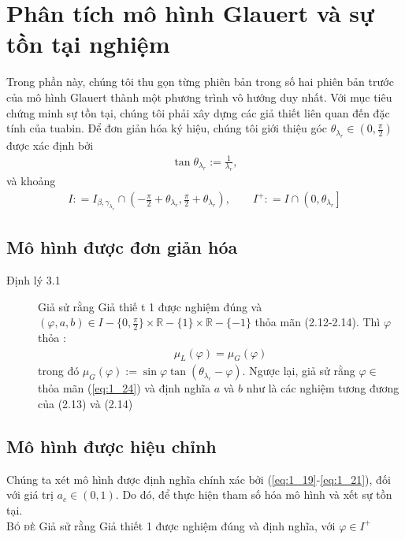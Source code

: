 \documentclass[a4paper,twoside,13pt]{extbook}
\begin{document}
\section{Phân tích mô hình Glauert và sự tồn tại nghiệm}

Trong phần này, chúng tôi thu gọn từng phiên bản trong số hai phiên bản trước của mô hình Glauert thành một phương trình vô hướng duy nhất. Với mục tiêu chứng minh sự tồn tại, chúng tôi phải xây dựng các giả thiết liên quan đến đặc tính của tuabin. Để đơn giản hóa ký hiệu, chúng tôi giới thiệu góc $\theta_{\lambda_r} \in (0,\frac{\pi}{2})$ được xác định bởi
\begin{equation}\label{eq:1_22}
    \begin{aligned}
        \tan\theta_{\lambda_r} := \frac{1}{\lambda_r},
    \end{aligned}
\end{equation}
và khoảng 
\begin{equation}\label{eq:1_23}
    \begin{aligned}
        I: = {I_{\beta ,{\gamma _{{\lambda _r}}}}} \cap \left( { - \frac{\pi }{2} + {\theta _{{\lambda _r}}},\frac{\pi }{2} + {\theta _{{\lambda _r}}}} \right),\qquad{I^ + }: = I \cap \left( {0,{\theta _{{\lambda _r}}}} \right]
    \end{aligned}
\end{equation}
\subsection{Mô hình được đơn giản hóa}

\begin{description}
    \item[Định lý 3.1] Giả sử rằng Giả thiế t 1 được nghiệm đúng và $(\varphi,a,b)\in I - \{0,\frac{\pi}{2}\}\times\mathbb{R} -\{1\} \times\mathbb{R}-\{-1\}$ thỏa mãn (2.12-2.14). Thì $\varphi$ thỏa :
    \begin{equation}\label{eq:1_24}
        \begin{aligned}
            \mu_L(\varphi) = \mu_G(\varphi)
        \end{aligned}
    \end{equation}
    trong đó $\mu_G(\varphi):=\sin\varphi\tan(\theta_{\lambda_r}-\varphi)$. Ngược lại, giả sử rằng $\varphi\in$ thỏa mãn (\ref{eq:1_24}) và định nghĩa $a$ và $b$ như là các nghiệm tương đương của (2.13) và (2.14) 
\end{description}
\subsection{Mô hình được hiệu chỉnh}

Chúng ta xét mô hình được định nghĩa chính xác bởi (\ref{eq:1_19}-\ref{eq:1_21}), đối với giá trị $a_c\in(0,1)$. Do đó, để thực hiện tham số hóa mô hình và xết sự tồn tại.\\

\textsc{Bổ đề } Giả sử rằng Giả thiết 1 được nghiệm đúng và định nghĩa, với $\varphi\in I^+$
\end{document}
